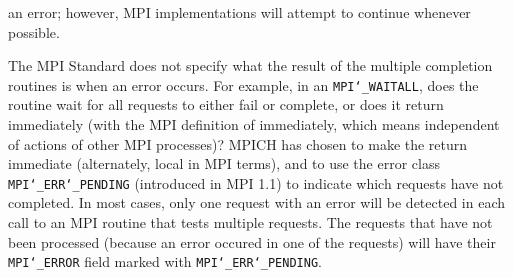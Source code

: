 an error; however, MPI implementations will attempt to continue whenever
possible.
\par
{}
The MPI Standard does not specify what the result of the multiple
completion routines is when an error occurs.  For example, in an
{\tt MPI{\tt \char`\_}WAITALL}, does the routine wait for all requests to either fail or
complete, or does it return immediately (with the MPI definition of
immediately, which means independent of actions of other MPI processes)?
MPICH has chosen to make the return immediate (alternately, local in MPI
terms), and to use the error class {\tt MPI{\tt \char`\_}ERR{\tt \char`\_}PENDING} (introduced in MPI 1.1)
to indicate which requests have not completed.  In most cases, only
one request with an error will be detected in each call to an MPI routine
that tests multiple requests.  The requests that have not been processed
(because an error occured in one of the requests) will have their
{\tt MPI{\tt \char`\_}ERROR} field marked with {\tt MPI{\tt \char`\_}ERR{\tt \char`\_}PENDING}.
\endmanpage
